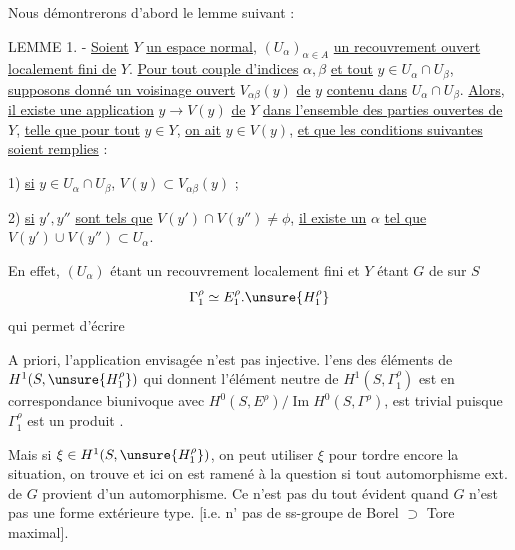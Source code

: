 Nous démontrerons d'abord le lemme suivant :

LEMME 1. - \uline{Soient} $Y$ \uline{un espace normal}, $(U_\alpha)_{\alpha\in A}$ \uline{un recouvrement ouvert localement fini de} $Y$. \uline{Pour tout couple d'indices} $\alpha,\beta$ \uline{et tout} $y\in U_\alpha\cap U_\beta$, \uline{supposons donné un voisinage ouvert} $V_{\alpha\beta}(y)$ \uline{de} $y$ \uline{contenu dans} $U_\alpha\cap U_\beta$. \uline{Alors}, \uline{il existe une application} $y\longrightarrow V(y)$ \uline{de} $Y$ \uline{dans l'ensemble des parties ouvertes de} $Y$, \uline{telle que pour tout} $y\in Y$, \uline{on ait} $y\in V(y)$, \uline{et que les conditions suivantes soient remplies} :

1) \uline{si} $y\in U_\alpha\cap U_\beta$, $V(y)\subset V_{\alpha\beta}(y)$ ;

2) \uline{si} $y',y''$ \uline{sont tels que} $V(y')\cap V(y'')\ne\phi$, \uline{il existe un} $\alpha$ \uline{tel que} $V(y')\cup V(y'')\subset U_\alpha$.

En effet, $(U_\alpha)$ étant un recouvrement localement fini et $Y$ étant
 $G$  de  sur $S$
\[
\Gamma_1^\rho\simeq E_1^\rho.\unsure{H_1^\rho}
\]
qui permet d'écrire

A priori, l'application envisagée n'est pas injective.  l'ens des éléments de $H^1(S,\unsure{H_1^\rho})$ qui donnent l'élément neutre de $H^1(S,\Gamma_1^\rho)$  est en correspondance biunivoque avec $H^0(S,E^\rho)/\operatorname{Im}H^0(S,\Gamma^\rho)$, est trivial puisque $\Gamma_1^\rho$ est un produit .

Mais si $\xi\in H^1(S,\unsure{H_1^\rho})$, on peut utiliser $\xi$ pour tordre encore la situation, on trouve
et ici on est ramené à la question si tout automorphisme ext. de $G$ provient d'un automorphisme. Ce n'est pas du tout évident quand $G$ n'est  pas une forme extérieure type. [i.e.  n' pas de ss-groupe de Borel $\supset$ Tore maximal].

